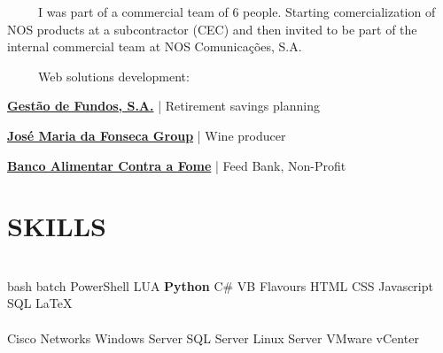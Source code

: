 \documentclass[letterpaper]{deedy-resume} %
\begin{document}
\begin{minipage}[t]{0.66\textwidth}
\sectionspace



\-\	\ \ \ \ I was part of a commercial team of 6 people. Starting comercialization of NOS products at a subcontractor (CEC) and then invited to be part of the internal commercial team at NOS Comunicações, S.A.

\sectionspace

\-\	\ \ \ \ Web solutions development:
\begin{tightitemize}
	\item \href{http://gestaodefundos.co.ao}{\textbf{Gestão de Fundos, S.A.}} | Retirement savings planning
	\item \href{http://www.jmf.pt/}{\textbf{José Maria da Fonseca Group}} | Wine producer
	\item \href{http://www.bancoalimentar.pt/}{\textbf{Banco Alimentar Contra a Fome}} | Feed Bank, Non-Profit
\end{tightitemize}

\sectionspace

\section{SKILLS}

\\
bash batch PowerShell LUA \textbullet{} \textbf{Python} C\# VB Flavours \textbullet{} HTML CSS Javascript \textbullet{} SQL \LaTeX{}\\
\\
Cisco Networks \textbullet{} Windows Server \textbullet{} SQL Server \textbullet{} Linux Server \textbullet{} VMware vCenter\\

\end{minipage} %

\end{document}
